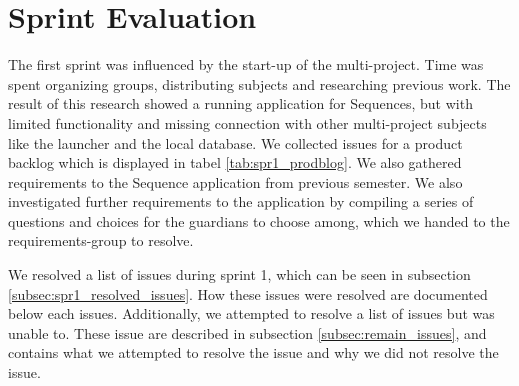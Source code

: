 \section{Sprint Evaluation}\label{sec:spr1_spreval}
The first sprint was influenced by the start-up of the multi-project. Time was spent organizing groups, distributing subjects and researching previous work. The result of this research showed a running application for Sequences, but with limited functionality and missing connection with other multi-project subjects like the launcher and the local database. We collected issues for a product backlog which is displayed in tabel \ref{tab:spr1_prodblog}. We also gathered requirements to the Sequence application from previous semester. We also investigated further requirements to the application by compiling a series of questions and choices for the guardians to choose among, which we handed to the requirements-group to resolve. 

We resolved a list of issues during sprint 1, which can be seen in subsection \ref{subsec:spr1_resolved_issues}. How these issues were resolved are documented below each issues. Additionally, we attempted to resolve a list of issues but was unable to. These issue are described in subsection \ref{subsec:remain_issues}, and contains what we attempted to resolve the issue and why we did not resolve the issue.